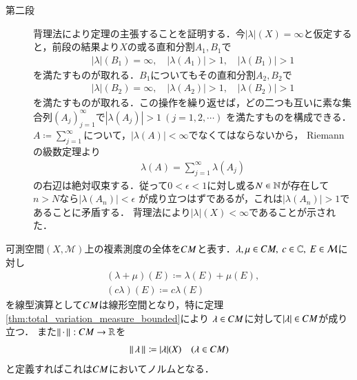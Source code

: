 \begin{prf}
\begin{description}
		\item[第二段]
			背理法により定理の主張することを証明する．今$|\lambda|(X) = \infty$と仮定すると，前段の結果より$X$の或る直和分割$A_1,B_1$で
			\begin{align}
				|\lambda|(B_1) = \infty, \quad |\lambda(A_1)| > 1, \quad |\lambda(B_1)| > 1
			\end{align}
			を満たすものが取れる．$B_1$についてもその直和分割$A_2,B_2$で
			\begin{align}
				|\lambda|(B_2) = \infty, \quad |\lambda(A_2)| > 1, \quad |\lambda(B_2)| > 1
			\end{align}
			を満たすものが取れる．この操作を繰り返せば，どの二つも互いに素な集合列$(A_j)_{j=1}^{\infty}$で$|\lambda(A_j)| > 1\ (j=1,2,\cdots)$
			を満たすものを構成できる．$A \coloneqq \sum_{j=1}^{\infty}$について，$|\lambda(A)| < \infty$でなくてはならないから，
			Riemannの級数定理より
			\begin{align}
				\lambda(A) = \sum_{j=1}^{\infty} \lambda(A_j)
			\end{align}
			の右辺は絶対収束する．従って$0 < \epsilon < 1$に対し或る$N \in \mathbb{N}$が存在して$n > N$なら$|\lambda(A_n)| < \epsilon$
			が成り立つはずであるが，これは$|\lambda(A_n)| > 1$であることに矛盾する．
			背理法により$|\lambda|(X) < \infty$であることが示された．
		\end{description}
		\QED
	\end{prf}
	
	\begin{itembox}[l]{}
		\begin{dfn}
			可測空間$(X,\mathcal{M})$上の複素測度の全体を$CM$と表す．$\lambda,\mu \in CM,\ c \in \mathbb{C},\ E \in \mathcal{M}$に対し
			\begin{align}
				&(\lambda + \mu)(E) \coloneqq \lambda(E) + \mu(E), \\
				&(c\lambda)(E) \coloneqq c\lambda(E)
				\label{complex_measure_linear}
			\end{align}
			を線型演算として$CM$は線形空間となり，特に定理\ref{thm:total_variation_measure_bounded}により
			$\lambda \in CM$に対して$|\lambda| \in CM$が成り立つ．
			また$\left\|\, \cdot\, \right\|_{}:CM \rightarrow \mathbb{R}$を
			\begin{align}
				\left\|\, \lambda\, \right\|_{} \coloneqq |\lambda|(X) \quad (\lambda \in CM)
			\end{align}
			と定義すればこれは$CM$においてノルムとなる．
		\end{dfn}
	\end{itembox}
	
